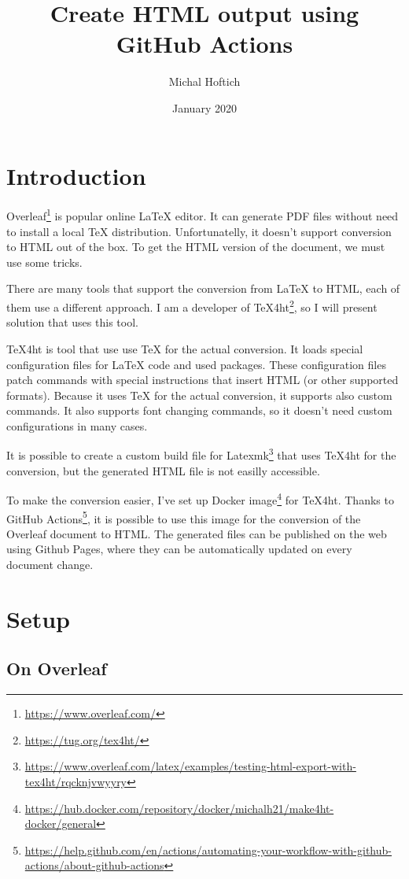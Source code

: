 \documentclass{article}
\title{Create HTML output using GitHub Actions}
\author{Michal Hoftich}
\date{January 2020}
\newcommand\footurl[1]{\footnote{\url{#1}}}
\begin{document}
\maketitle

\section{Introduction}

Overleaf\footurl{https://www.overleaf.com/} is popular online \LaTeX{} editor. It can generate PDF files 
without need to install a local \TeX{} distribution. Unfortunatelly, it doesn't support conversion to HTML out of the box. To get the HTML version of the document, we must use some tricks.

There are many tools that support the conversion from \LaTeX{} to HTML, each of them use a different approach. I am a developer of \TeX4ht\footurl{https://tug.org/tex4ht/}, so I will present solution that uses this tool. 

\TeX4ht is tool that use use \TeX{} for the actual conversion. It loads special configuration files for \LaTeX{} code and used packages. These configuration files patch commands with special instructions that insert HTML (or other supported formats). Because it uses \TeX{} for the actual conversion, it supports also custom commands. It also supports font changing commands, so  it doesn't need custom configurations in many cases.

It is possible to create a custom build file for Latexmk\footurl{https://www.overleaf.com/latex/examples/testing-html-export-with-tex4ht/rqcknjvwyyry} 
that uses \TeX4ht for the conversion, but the generated HTML file is not easilly accessible.

To make the conversion easier, I've set up Docker image\footurl{https://hub.docker.com/repository/docker/michalh21/make4ht-docker/general} for \TeX4ht. 
Thanks to GitHub Actions\footurl{https://help.github.com/en/actions/automating-your-workflow-with-github-actions/about-github-actions}, 
it is possible to use this image for the conversion of the Overleaf document to HTML. 
The generated files can be published on the web using Github Pages, where they can be automatically 
updated on every document change.

\section{Setup}

\subsection{On Overleaf}
\end{document}
